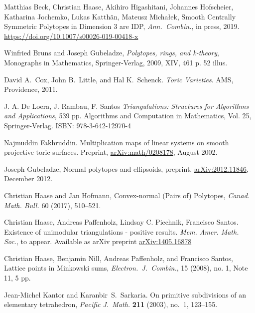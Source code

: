 \documentclass{amsart}
\theoremstyle{plain}
\theoremstyle{definition}
\begin{document}
\begin{thebibliography}{99} 

Matthias Beck, Christian Haase, Akihiro Higashitani, Johannes Hofscheier, Katharina Jochemko, Lukas Katth\"an, Mateusz Micha{\l}ek,
Smooth Centrally Symmetric Polytopes in Dimension 3 are IDP,
\emph{Ann.~Combin.}, in press, 2019.
\url{https://doi.org/10.1007/s00026-019-00418-x}

Winfried Bruns and Joseph Gubeladze, \emph{Polytopes, rings, and k-theory}, Monographs in Mathematics,
  Springer-Verlag, 2009, XIV, 461 p. 52 illus.
  
David A.~Cox, John B.~Little, and Hal K.~Schenck.
{\em {T}oric {V}arieties}.
AMS, Providence, 2011.

J. A. De Loera, J. Rambau, F. Santos
\emph{Triangulations: Structures for Algorithms and Applications}, 539 pp.
Algorithms and Computation in Mathematics, Vol. 25, Springer-Verlag. 
ISBN: 978-3-642-12970-4

Najmuddin Fakhruddin.
\newblock Multiplication maps of linear systems on smooth projective toric surfaces.
  Preprint, 
  \href{https://arxiv.org/abs/math/0208178}{arXiv:math/0208178}, August 2002.



Joseph Gubeladze,
Normal polytopes and ellipsoids,
preprint, \href{https://arxiv.org/abs/2012.11846}{arXiv:2012.11846}, December 2012.
  


Christian Haase and Jan Hofmann, 
Convex-normal (Pairs of) Polytopes, 
\emph{Canad. Math. Bull.} 60 (2017), 510--521.

Christian Haase, Andreas Paffenholz, Lindsay C. Piechnik, Francisco Santos. Existence of unimodular triangulations - positive results. 
 \emph{Mem. Amer. Math. Soc.}, to appear.
 Available as arXiv preprint \href{https://arxiv.org/abs/1405.1687}{arXiv:1405.16878}
 
Christian Haase, Benjamin Nill, Andreas Paffenholz, and Francisco Santos, Lattice points in Minkowski sums, 
\emph{Electron.~J.~Combin.}, 15 (2008), no. 1, Note 11, 5 pp.

Jean-Michel Kantor and Karanbir~S.\ Sarkaria.
On primitive subdivisions of an elementary tetrahedron, 
\emph{Pacific J.~Math.} \textbf{211} (2003), no.~1,  123--155.


\end{thebibliography}
\end{document}
